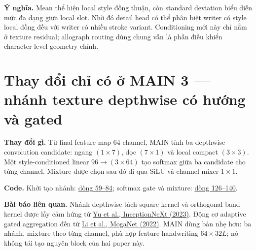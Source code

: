 \documentclass[10pt,a4paper]{article}
\newcommand{\paper}[2]{\href{#1}{#2}}
\begin{document}
\textbf{Ý nghĩa.} Mean thể hiện local style đồng thuận, còn standard deviation biểu diễn mức đa dạng giữa local slot. Nhờ đó detail head có thể phân biệt writer có style local đồng đều với writer có nhiều stroke variant. Conditioning mới này chỉ nằm ở texture residual; allograph routing dùng chung vẫn là phần điều khiển character-level geometry chính.

\section{Thay đổi chỉ có ở MAIN 3 --- nhánh texture depthwise có hướng và gated}

\textbf{Thay đổi gì.} Từ final feature map $64$ channel, MAIN tính ba depthwise convolution candidate: ngang $(1\times7)$, dọc $(7\times1)$ và local compact $(3\times3)$. Một style-conditioned linear $96\rightarrow(3\times64)$ tạo softmax giữa ba candidate cho từng channel. Mixture được chọn sau đó đi qua SiLU và channel mixer $1\times1$.

\textbf{Code.} Khởi tạo nhánh: \href{https://github.com/rquq/HGGAN_test/blob/main/networks/texture_generator.py\#L59-L84}{dòng 59--84}; softmax gate và mixture: \href{https://github.com/rquq/HGGAN_test/blob/main/networks/texture_generator.py\#L126-L140}{dòng 126--140}.

\textbf{Bài báo liên quan.} Nhánh depthwise tách square kernel và orthogonal band kernel được lấy cảm hứng từ \paper{https://arxiv.org/abs/2303.16900}{Yu et al., InceptionNeXt (2023)}. Động cơ adaptive gated aggregation đến từ \paper{https://arxiv.org/abs/2211.03295}{Li et al., MogaNet (2022)}. MAIN dùng bản nhẹ hơn: ba nhánh, mixture theo từng channel, phù hợp feature handwriting $64\times32L$; nó không tái tạo nguyên block của hai paper này.
\end{document}
